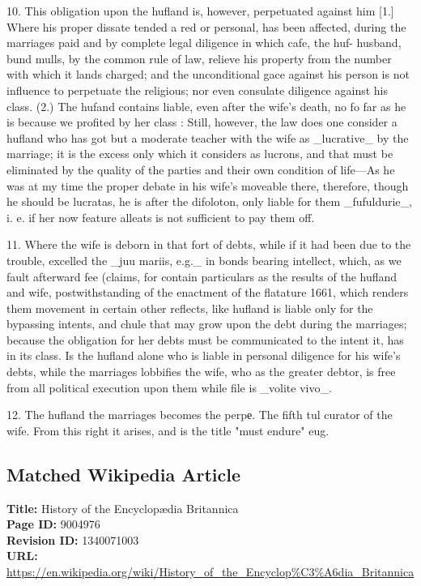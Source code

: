 \documentclass{article}
\begin{document}
10. This obligation upon the hufland is, however, perpetuated against him [1.] Where his proper dissate tended a red or personal, has been affected, during the marriages paid and by complete legal diligence in which cafe, the huf- husband, bund mulls, by the common rule of law, relieve his property from the number with which it lands charged; and the unconditional gace against his person is not influence to perpetuate the religious; nor even consulate diligence against his class. (2.) The hufand contains liable, even after the wife’s death, no fo far as he is because we profited by her class : Still, however, the law does one consider a hufland who has got but a moderate teacher with the wife as \_lucrative\_ by the marriage; it is the excess only which it considers as lucrons, and that must be eliminated by the quality of the parties and their own condition of life—As he was at my time the proper debate in his wife’s moveable there, therefore, though he should be lucratas, he is after the difoloton, only liable for them \_fufuldurie\_, i. e. if her now feature alleats is not sufficient to pay them off.

11. Where the wife is deborn in that fort of debts, while if it had been due to the trouble, excelled the \_juu mariis, e.g.\_ in bonds bearing intellect, which, as we fault afterward fee (claims, for contain particulars as the results of the hufland and wife, postwithstanding of the enactment of the flatature 1661, which renders them movement in certain other reflects, like hufland is liable only for the bypassing intents, and chule that may grow upon the debt during the marriages; because the obligation for her debts must be communicated to the intent it, has in its class. Is the hufland alone who is liable in personal diligence for his wife’s debts, while the marriages lobbifies the wife, who as the greater debtor, is free from all political execution upon them while file is \_volite vivo\_.

12. The hufland the marriages becomes the perpе. The fifth tul curator of the wife. From this right it arises, and is the title "must endure" eug.

\subsection*{Matched Wikipedia Article}
\textbf{Title:} History of the Encyclopædia Britannica \\
\textbf{Page ID:} 9004976 \\
\textbf{Revision ID:} 1340071003 \\
\textbf{URL:} \url{https://en.wikipedia.org/wiki/History\_of\_the\_Encyclop\%C3\%A6dia\_Britannica}
\end{document}
